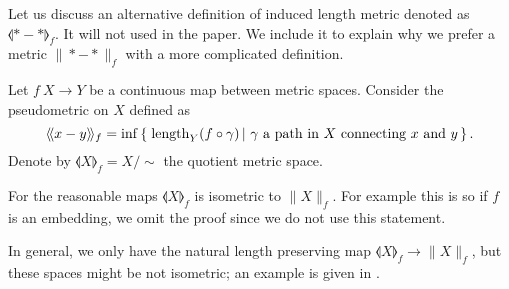 \documentclass{article}
\begin{document}






Let us discuss an alternative definition of induced length metric denoted as $\llangle {*}-{*}\rrangle_f$.
It will not used in the paper.
We include it to explain why we prefer a metric $\|{*}-{*}\|_f$ with a more complicated definition.

Let $f\:X\to Y$ be a continuous map between metric spaces. 
Consider the pseudometric on $X$ defined as
\[\llangle x-y\rrangle_f
=
\inf
\set{\length_Y(f\circ\gamma)}{\gamma\ \text{a path in}\  X\ \text{connecting}\ x\ \text{and}\ y}.\]
Denote by $\llangle X\rrangle_f=X/\sim$ the quotient metric space.

For the reasonable maps $\llangle X\rrangle_f$ is isometric to $\|X\|_f$.
For example this is so if $f$ is an embedding, we omit the proof since we do not use this statement.

In general, we only have the natural length preserving map $\llangle X\rrangle_f\to \|X\|_f$,
but these spaces might be not isometric;
an example is given in \cite[4.2]{petrunin-intrinisic}.
\end{document}
